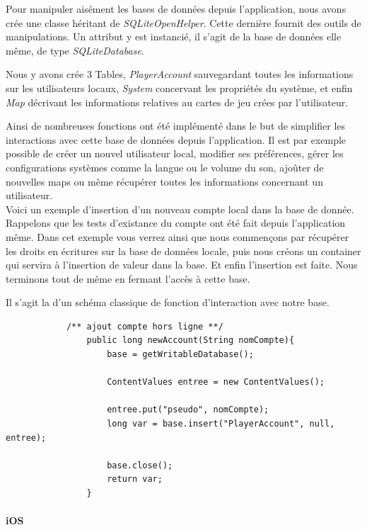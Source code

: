 \documentclass[a4paper,11pt]{report}
\begin{document}
			Pour manipuler aisément les bases de données depuis l'application,
			nous avons crée une classe héritant de \textit{SQLiteOpenHelper}. Cette
			dernière fournit des outils de manipulations. Un attribut y est
			instancié, il s'agit de la base de données elle même, de type
			\textit{SQLiteDatabase}.
			
			Nous y avons crée 3 Tables, \textit{PlayerAccount} sauvegardant toutes les
			informations sur les utilisateurs locaux, \textit{System} concervant les
			propriétés du système, et enfin \textit{Map} décrivant les informations
			relatives au cartes de jeu crées par l'utilisateur.
			
			Ainsi de nombreuses	fonctions ont été implémenté dans le but de simplifier les interactions
			avec cette base de données depuis l'application. Il est par exemple possible de créer un nouvel 
			utilisateur local, modifier ses préférences, gérer les configurations systèmes comme la langue ou le volume
			du son, ajoûter de nouvelles maps ou même récupérer toutes les informations
			concernant un utilisateur.\\
			
			Voici un exemple d'insertion d'un nouveau compte local dans la base de
			donnée. Rappelons que les tests d'existance du compte ont été fait depuis
			l'application même. Dans cet exemple vous verrez ainsi que nous commençons
			par récupérer les droits en écritures sur la base de données locale, puis
			nous créons un container qui servira à l'insertion de valeur dans la base. Et
			enfin l'insertion est faite. Nous terminons tout de même en fermant l'accès à
			cette base.
			
			Il s'agit la d'un schéma classique de fonction d'interaction avec notre
			base.
						
			\begin{verbatim}
			/** ajout compte hors ligne **/
				public long newAccount(String nomCompte){
					base = getWritableDatabase();
			
					ContentValues entree = new ContentValues();
					
					entree.put("pseudo", nomCompte);
					long var = base.insert("PlayerAccount", null, entree);
					
					base.close();
					return var;
				}
			\end{verbatim}

			
			\paragraph{iOS}
				
\end{document}
